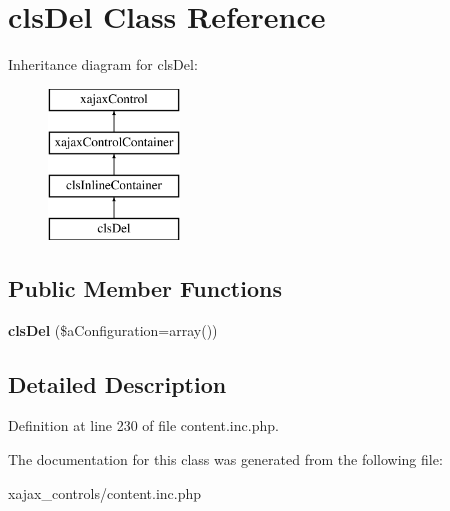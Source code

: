 \hypertarget{classclsDel}{
\section{clsDel Class Reference}
\label{classclsDel}
}
Inheritance diagram for clsDel:\begin{figure}[H]
\begin{center}
\leavevmode
\includegraphics[height=4.000000cm]{classclsDel}
\end{center}
\end{figure}
\subsection*{Public Member Functions}
\begin{DoxyCompactItemize}
\item 
\hypertarget{classclsDel_ab198d7892032e0d1ff7fa97d97fc8ef8}{
{\bfseries clsDel} (\$aConfiguration=array())}
\label{classclsDel_ab198d7892032e0d1ff7fa97d97fc8ef8}

\end{DoxyCompactItemize}


\subsection{Detailed Description}


Definition at line 230 of file content.inc.php.



The documentation for this class was generated from the following file:\begin{DoxyCompactItemize}
\item 
xajax\_\-controls/content.inc.php\end{DoxyCompactItemize}

